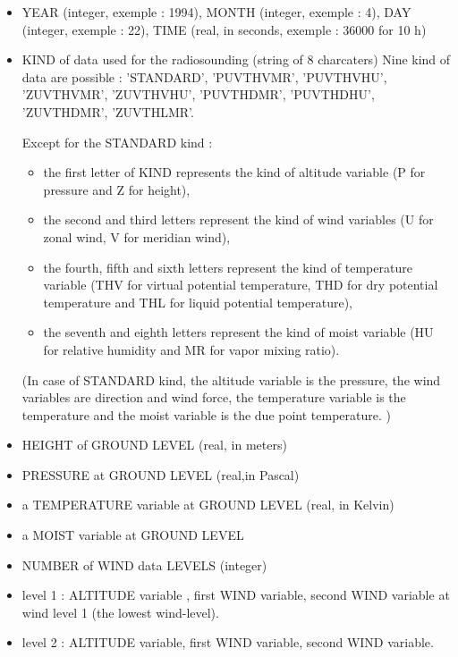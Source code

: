 \begin{itemize}
\item YEAR (integer, exemple : 1994), MONTH (integer, exemple : 4), DAY
(integer, exemple : 22), TIME (real, in seconds, exemple : 36000 for 10 h)

\item KIND of data used for the radiosounding (string of 8 charcaters)
Nine kind of data are possible : 'STANDARD', 'PUVTHVMR', 'PUVTHVHU',
'ZUVTHVMR', 'ZUVTHVHU', 'PUVTHDMR', 'PUVTHDHU', 'ZUVTHDMR', 'ZUVTHLMR'.

Except for the STANDARD kind :  \begin{itemize}
\item  the first letter of KIND represents the kind of altitude
variable (P for pressure and Z for height), 
\item the second and third letters represent  the kind of wind
variables (U for zonal wind, V for meridian  wind), 
\item the fourth, fifth and sixth letters represent  the kind of
temperature variable (THV for virtual potential temperature, THD
for dry potential temperature and THL for liquid potential
temperature), 
\item the seventh and eighth letters represent  the kind of moist
variable (HU for relative humidity and MR for vapor mixing ratio). 
\end{itemize}

(In case of STANDARD kind, the altitude
variable is the pressure, the wind variables are direction and wind force,
the temperature variable is the temperature and the moist variable is the due
point temperature. )

\item HEIGHT of GROUND LEVEL (real, in meters)
\item PRESSURE at GROUND LEVEL (real,in Pascal)
\item a TEMPERATURE variable  at GROUND LEVEL (real, in Kelvin) 
\item a MOIST variable  at GROUND LEVEL

\item NUMBER of WIND data LEVELS (integer)

\item level 1 :  ALTITUDE variable ,  first WIND variable,  second WIND variable
at wind level 1 (the lowest wind-level).

\item level 2 :  ALTITUDE variable, first WIND variable,  second WIND variable.


\end{itemize}
